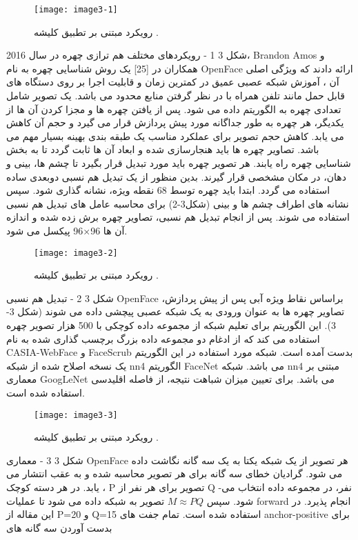  \begin{figure}[h]
\centering
  \texttt{[image: image3-1]}
  \caption{رویکرد مبتنی بر تطبیق کلیشه  \cite{ref1}.}
  \label{image2-1}
\end{figure}
شکل ‏3 1 - رویکردهای مختلف هم ترازی چهره
در سال 2016، Brandon Amos و همکاران در [25] یک روش شناسایی چهره به نام OpenFace ارائه دادند که ویژگی اصلی آن ، آموزش شبکه عصبی عمیق در کمترین زمان و قابلیت اجرا بر روی دستگاه های قابل حمل مانند تلفن همراه با در نظر گرفتن منابع محدود می باشد. یک تصویر شامل تعدادی چهره به الگوریتم داده می شود. پس از یافتن چهره ها و مجزا کردن  آن ها از یکدیگر، هر چهره به طور جداگانه مورد پیش پردازش  قرار می گیرد و حجم آن کاهش می یابد. کاهش حجم تصویر برای عملکرد مناسب یک طبقه بندی بهینه بسیار مهم می باشد. تصاویر چهره ها باید هنجارسازی شده و ابعاد آن ها ثابت گردد تا به بخش شناسایی چهره راه یابند.
هر تصویر چهره باید مورد تبدیل قرار بگیرد تا چشم ها، بینی و دهان، در مکان مشخصی قرار گیرند. بدین منظور از یک تبدیل هم نسبی  دوبعدی ساده استفاده می گردد. ابتدا باید چهره توسط 68 نقطه ویژه، نشانه گذاری شود. سپس نشانه های اطراف چشم ها و بینی (شکل3-2) برای محاسبه عامل های تبدیل هم نسبی استفاده می شوند. پس از انجام تبدیل هم نسبی، تصاویر چهره برش زده شده و اندازه آن ها 96×96 پیکسل می شود.
 \begin{figure}[h]
\centering
  \texttt{[image: image3-2]}
  \caption{رویکرد مبتنی بر تطبیق کلیشه  \cite{ref1}.}
  \label{image2-1}
\end{figure}
شکل ‏3 2 - تبدیل هم نسبی OpenFace براساس نقاط ویژه آبی 
پس از پیش پردازش، تصاویر چهره ها به عنوان ورودی به یک شبکه عصبی پیچشی داده می شوند (شکل 3-3). این الگوریتم برای تعلیم شبکه از مجموعه داده کوچکی با 500 هزار تصویر چهره استفاده می کند که از ادغام دو مجموعه داده بزرگ برچسب گذاری شده به نام CASIA-WebFace و FaceScrub بدست آمده است. شبکه مورد استفاده در این الگوریتم یک نسخه اصلاح شده از شبکه nn4 الگوریتم FaceNet می باشد. شبکه nn4 مبتنی بر معماری GoogLeNet می باشد. برای تعیین میزان شباهت نتیجه، از فاصله اقلیدسی استفاده شده است.
 \begin{figure}[h]
\centering
  \texttt{[image: image3-3]}
  \caption{رویکرد مبتنی بر تطبیق کلیشه  \cite{ref1}.}
  \label{image2-1}
\end{figure}
شکل ‏3 3 - معماری OpenFace
هر تصویر از یک شبکه یکتا به یک سه گانه نگاشت داده می شود. گرادیان خطای سه گانه برای هر تصویر محاسبه شده و به عقب انتشار می یابد. در هر دسته کوچک ، P تصویر برای هر نفر از Q نفر، در مجموعه داده انتخاب می-شود. 
سپس
$M \approx PQ$
تصویر به شبکه داده می شود تا عملیات forward انجام پذیرد. در این مقاله از P=20 و Q=15 استفاده شده است. تمام جفت های anchor-positive برای بدست آوردن سه گانه های
